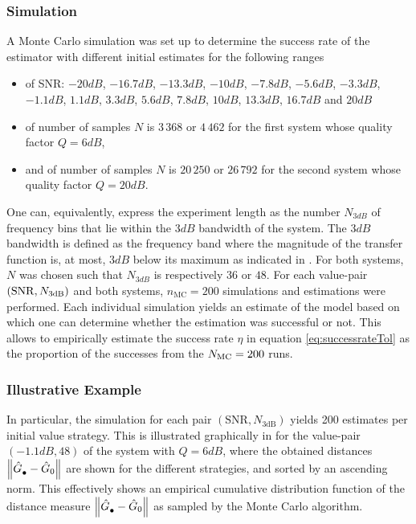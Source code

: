 \subsubsection{Simulation}
A Monte Carlo simulation was set up to determine the success rate of the estimator with different initial estimates for the following ranges %
\begin{itemize}
\item of SNR: 
              $-20   \unit{dB}$, 
              $-16.7 \unit{dB}$, 
              $-13.3 \unit{dB}$, 
              $-10   \unit{dB}$, 
              $- 7.8 \unit{dB}$, 
              $- 5.6 \unit{dB}$, 
              $- 3.3 \unit{dB}$, 
              $- 1.1 \unit{dB}$, 
              $  1.1 \unit{dB}$, 
              $  3.3 \unit{dB}$, 
              $  5.6 \unit{dB}$, 
              $  7.8 \unit{dB}$, 
              $ 10   \unit{dB}$, 
              $ 13.3 \unit{dB}$, 
              $ 16.7 \unit{dB}$ and
              $ 20   \unit{dB}$
\item of number of samples $N$ is $3\,368$ or $4\,462$ for the first system whose quality factor $Q= 6 \unit{dB}$,
\item and of number of samples $N$ is $20\,250$ or $26\,792$ for the second system whose quality factor $Q = 20\unit{dB}$.
\end{itemize}
One can, equivalently, express the experiment length as the number $N_{3\unit{dB}}$ of frequency bins that lie within the $3\unit{dB}$ bandwidth of the system.
The $3\unit{dB}$ bandwidth is defined as the frequency band where the magnitude of the transfer function is, at most, $3\unit{dB}$ below its maximum as indicated in .
For both systems, $N$ was chosen such that $N_{3\unit{dB}}$ is respectively $36$ or $48$.
For each value-pair $(\mathrm{SNR}, N_{3\mathrm{dB}})$ and both systems, $n_{\mathrm{MC}} = 200$  simulations and estimations were performed.
Each individual simulation yields an estimate of the model based on which one can determine whether the estimation was successful or not.
This allows to empirically estimate the success rate $\eta$ in equation \eqref{eq:successrateTol} as the proportion of the successes from the $N_{\mathrm{MC}} = 200$ runs.


\subsubsection{Illustrative Example}
In particular, the simulation for each pair $(\mathrm{SNR}, N_{3\mathrm{dB}})$ yields 200 estimates per initial value strategy.
This is illustrated graphically in  for the value-pair $(-1.1\unit{dB},48)$ of the system with $Q = 6 \unit{dB}$, where the obtained distances $\left\| \hat{G}_{\mathrm{\bullet}}^{\mathrm{}} - \hat{G}_{0} \right\|_{}$ are shown for the different strategies, and sorted by an ascending norm.
This effectively shows an empirical cumulative distribution function of the distance measure $\left\| \hat{G}_{\mathrm{\bullet}}^{\mathrm{}} - \hat{G}_{0} \right\|_{}$ as sampled by the Monte Carlo algorithm.%
 
